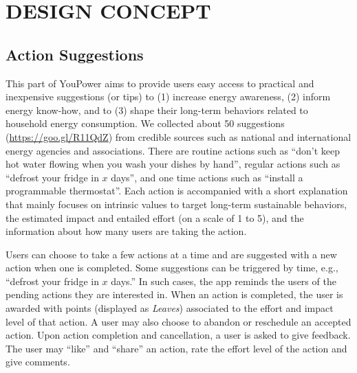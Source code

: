 
\section{\uppercase{Design Concept}}
\label{sect:design_concept}

\subsection{Action Suggestions}
\label{sect:tips}

This part of YouPower aims to provide users easy access to practical and inexpensive suggestions (or tips) to (1) increase energy awareness, (2) inform energy know-how, and to (3) shape their long-term behaviors related to household energy consumption.
% 
We collected about 50 suggestions (\url{https://goo.gl/R11QdZ}) from credible sources such as national and international energy agencies and associations. There are routine actions such as ``don't keep hot water flowing when you wash your dishes by hand'', regular actions such as ``defrost your fridge in $x$ days'', and one time actions such as ``install a programmable thermostat''.  
Each action is accompanied with a short explanation that mainly focuses on intrinsic values to target long-term sustainable behaviors, the estimated impact and entailed effort (on a scale of 1 to 5), and the information about how many users are taking the action. 

Users can choose to take a few actions at a time and are suggested with a new action when one is completed. 
Some suggestions can be triggered by time, e.g., ``defrost your fridge in $x$ days.'' In such cases, the app reminds the users of the pending actions they are interested in. 
%
When an action is completed, the user is awarded with points (displayed as \textit{Leaves}) associated to the effort and impact level of that action. 
A user may also choose to abandon or reschedule an accepted action. 
Upon action completion and cancellation, a user is asked to give feedback. 
The user may ``like'' and ``share'' an action, rate the effort level of the action and give comments. 


